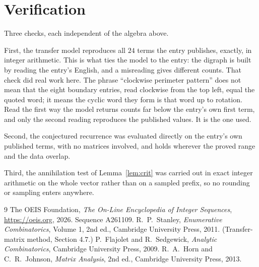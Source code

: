 \documentclass[11pt,a4paper]{article}
\theoremstyle{plain}
\theoremstyle{definition}
\begin{document}
\section{Verification}

Three checks, each independent of the algebra above.

First, the transfer model reproduces all $24$ terms the entry publishes, exactly, in
integer arithmetic. This is what ties the model to the entry: the digraph is built by reading
the entry's English, and a misreading gives different counts. That check did real work here. The phrase ``clockwise perimeter pattern'' does not mean that the eight boundary entries, read clockwise from the top left, equal the quoted word; it means the cyclic word they form is that word up to rotation. Read the first way the model returns counts far below the entry's own first term, and only the second reading reproduces the published values. It is the one used.

Second, the conjectured recurrence was evaluated directly on the entry's own published terms,
with no matrices involved, and holds wherever the proved range and the data overlap.

Third, the annihilation test of Lemma~\ref{lem:crit} was carried out in exact integer
arithmetic on the whole vector rather than on a sampled prefix, so no rounding or sampling
enters anywhere.

\begin{thebibliography}{9}
 The OEIS Foundation, \emph{The On-Line Encyclopedia of Integer
Sequences}, \url{https://oeis.org}, 2026. Sequence A261109.
 R.~P.~Stanley, \emph{Enumerative Combinatorics}, Volume 1, 2nd ed.,
Cambridge University Press, 2011. (Transfer-matrix method, Section 4.7.)
 P.~Flajolet and R.~Sedgewick, \emph{Analytic Combinatorics}, Cambridge
University Press, 2009.
 R.~A.~Horn and C.~R.~Johnson, \emph{Matrix Analysis}, 2nd ed., Cambridge
University Press, 2013.
\end{thebibliography}
\end{document}
